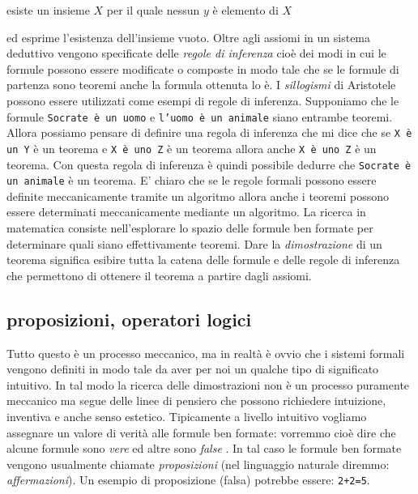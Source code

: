 \begin{displayquote}
esiste un insieme $X$ per il quale nessun $y$ è elemento di $X$
\end{displayquote}
ed esprime l'esistenza dell'insieme vuoto.
Oltre agli assiomi in un sistema deduttivo vengono specificate delle 
\emph{regole di inferenza} cioè dei modi in cui 
le formule possono essere modificate o composte in modo tale che se le formule 
di partenza sono teoremi anche la formula ottenuta lo è.
I \emph{sillogismi} di Aristotele possono essere utilizzati come esempi di regole 
di inferenza. 
Supponiamo che le formule 
\texttt{Socrate è un uomo} 
e \texttt{l'uomo è un animale}
siano entrambe teoremi. Allora possiamo pensare di definire una regola di inferenza 
che mi dice che se \texttt{X è un Y} è un teorema 
e \texttt{X è uno Z}
è un teorema allora anche \texttt{X è uno Z} è un teorema. 
Con questa regola di inferenza è quindi possibile dedurre che 
\texttt{Socrate è un animale}
è un teorema.
E' chiaro che se le regole formali possono essere definite meccanicamente 
tramite un algoritmo allora anche i teoremi possono essere determinati meccanicamente 
mediante un algoritmo.
La ricerca in matematica consiste nell'esplorare lo spazio delle formule ben formate 
per determinare quali siano effettivamente teoremi. 
Dare la \emph{dimostrazione}%
%
 di un teorema significa esibire tutta la catena delle formule 
e delle regole di inferenza che permettono di ottenere il teorema a partire dagli 
assiomi.

\subsection{proposizioni, operatori logici}

Tutto questo è un processo meccanico, ma in realtà è ovvio che i sistemi formali 
vengono definiti in modo tale da aver per noi un qualche tipo di significato intuitivo.
In tal modo la ricerca delle dimostrazioni non è un processo puramente meccanico 
ma segue delle linee di pensiero che possono richiedere intuizione, inventiva e anche 
senso estetico. 
Tipicamente a livello intuitivo vogliamo assegnare un valore di verità alle formule 
ben formate: vorremmo cioè dire che alcune formule sono 
\emph{vere}%
%
ed altre sono 
\emph{false}%
%
. 
In tal caso le formule ben formate vengono usualmente chiamate \emph{proposizioni}%
%
(nel linguaggio naturale diremmo: \emph{affermazioni}).
Un esempio di proposizione (falsa) potrebbe essere: 
\texttt{2+2=5}.


